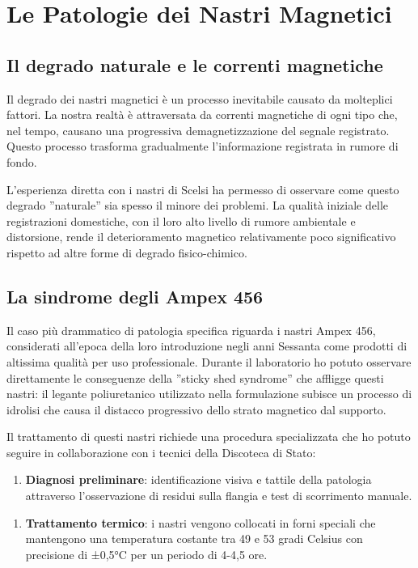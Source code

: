 
\section{Le Patologie dei Nastri Magnetici}
\subsection{Il degrado naturale e le correnti magnetiche}
Il degrado dei nastri magnetici è un processo inevitabile causato da molteplici fattori. La nostra realtà è attraversata da correnti magnetiche di ogni tipo che, nel tempo, causano una progressiva demagnetizzazione del segnale registrato. Questo processo trasforma gradualmente l'informazione registrata in rumore di fondo.

L'esperienza diretta con i nastri di Scelsi ha permesso di osservare come questo degrado ''naturale'' sia spesso il minore dei problemi. La qualità iniziale delle registrazioni domestiche, con il loro alto livello di rumore ambientale e distorsione, rende il deterioramento magnetico relativamente poco significativo rispetto ad altre forme di degrado fisico-chimico\cite[p. 170]{Bernardini2007recoveringgia}.
\subsection{La sindrome degli Ampex 456}
Il caso più drammatico di patologia specifica riguarda i nastri Ampex 456, considerati all'epoca della loro introduzione negli anni Sessanta come prodotti di altissima qualità per uso professionale. Durante il laboratorio ho potuto osservare direttamente le conseguenze della ''sticky shed syndrome'' che affligge questi nastri: il legante poliuretanico utilizzato nella formulazione subisce un processo di idrolisi che causa il distacco progressivo dello strato magnetico dal supporto.

Il trattamento di questi nastri richiede una procedura specializzata che ho potuto seguire in collaborazione con i tecnici della Discoteca di Stato:

\begin{enumerate}
    \item \textbf{Diagnosi preliminare}: identificazione visiva e tattile della patologia attraverso l'osservazione di residui sulla flangia e test di scorrimento manuale.
\end{enumerate}

\begin{enumerate}
    \item \textbf{Trattamento termico}: i nastri vengono collocati in forni speciali che mantengono una temperatura costante tra 49 e 53 gradi Celsius con precisione di ±0,5°C per un periodo di 4-4,5 ore.
\end{enumerate}

